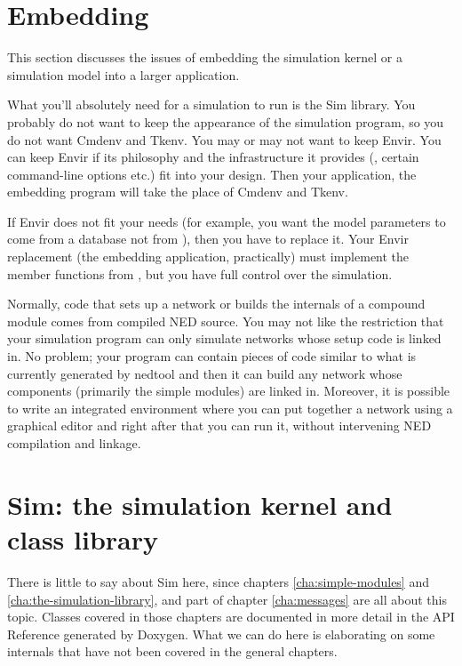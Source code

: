 \section{Embedding {\opp}}
\label{sec:ch-opp-design:embedding}

This section discusses the issues of embedding the simulation kernel
or a simulation model into a larger application.

What you'll absolutely need for a simulation to run is the Sim library. You
probably do not want to keep the appearance of the simulation program, so
you do not want Cmdenv and Tkenv. You may or may not want to keep Envir.
You can keep Envir if its philosophy and the infrastructure it provides
(, certain command-line options etc.) fit into your
design. Then your application, the embedding program will take the place of
Cmdenv and Tkenv.

If Envir does not fit your needs (for example, you want the model
parameters to come from a database not from ), then you
have to replace it. Your Envir replacement (the embedding application,
practically) must implement the  member functions from
, but you have full control over the simulation.

Normally, code that sets up a network or builds the internals of a
compound module comes from compiled NED source.  You may not like the
restriction that your simulation program can only simulate networks
whose setup code is linked in. No problem; your program can contain
pieces of code similar to what is currently generated by nedtool and then
it can build any network whose components (primarily the simple modules)
are linked in. Moreover, it is possible to write an integrated environment
where you can put together a network using a graphical editor and right
after that you can run it, without intervening NED compilation and
linkage.





\section{Sim: the simulation kernel and class library}

There is little to say about Sim here, since chapters
\ref{cha:simple-modules} and \ref{cha:the-simulation-library},
and part of chapter \ref{cha:messages} are all about
this topic. Classes covered in those chapters are documented
in more detail in the API Reference generated by Doxygen.
What we can do here is elaborating on some internals
that have not been covered in the general chapters.

